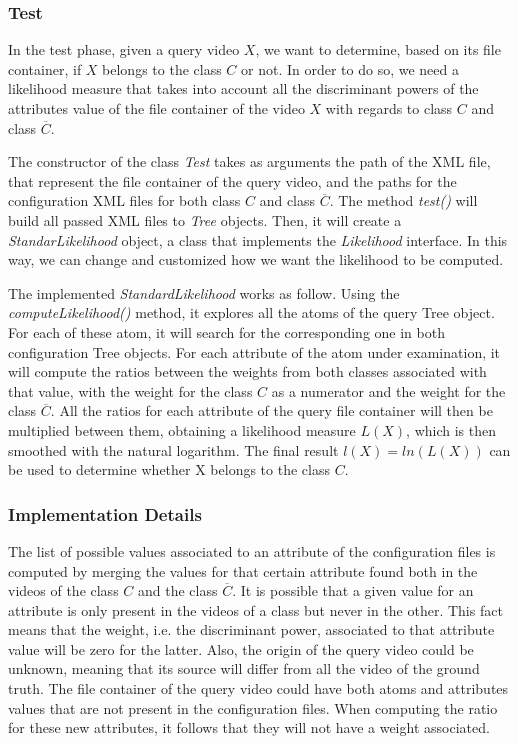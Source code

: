 \subsubsection{Test}

In the test phase, given a query video $X$, we want to determine, based on its file container, if $X$ belongs to the class $C$ or not. In order to do so, we need a likelihood measure that takes into account all the discriminant powers of the attributes value of the file container of the video $X$ with regards to class $C$ and class $\overline{C}$.

The constructor of the class \emph{Test} takes as arguments the path of the XML file, that represent the file container of the query video, and the paths for the configuration XML files for both class $C$ and class $\overline{C}$.
The method \emph{test()} will build all passed XML files to \emph{Tree} objects. Then, it will create a \emph{StandarLikelihood} object, a class that implements the \emph{Likelihood} interface. In this way, we can change and customized how we want the likelihood to be computed.

The implemented \emph{StandardLikelihood} works as follow. Using the \emph{computeLikelihood()} method, it explores all the atoms of the query Tree object. For each of these atom, it will search for the corresponding one in both configuration Tree objects. For each attribute of the atom under examination, it will compute the ratios between the weights from both classes associated with that value, with the weight for the class $C$ as a numerator and the weight for the class $\overline{C}$. All the ratios for each attribute of the query file container will then be multiplied between them, obtaining a likelihood measure $L(X)$, which is then smoothed with the natural logarithm. 
The final result $l(X) = ln(L(X))$ can be used to determine whether X belongs to the class $C$.


\subsubsection{Implementation Details}

The list of possible values associated to an attribute of the configuration files is computed by merging the values for that certain attribute found both in the videos of the class $C$ and the class $\overline{C}$. It is possible that a given value for an attribute is only present in the videos of a class but never in the other. This fact means that the weight, i.e. the discriminant power, associated to that attribute value will be zero for the latter.
Also, the origin of the query video could be unknown, meaning that its source will differ from all the video of the ground truth. The file container of the query video could have both atoms and attributes values that are not present in the configuration files. When computing the ratio for these new attributes, it follows that they will not have a weight associated.

